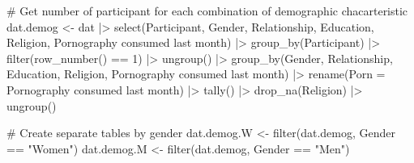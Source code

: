 \documentclass[
  bookmarksnumbered]{article}
\newenvironment{Shaded}{\begin{snugshade}}{\end{snugshade}}
\newcommand{\AttributeTok}[1]{\textcolor[rgb]{0.80,0.80,0.80}{#1}}
\newcommand{\CommentTok}[1]{\textcolor[rgb]{0.50,0.62,0.50}{#1}}
\newcommand{\DecValTok}[1]{\textcolor[rgb]{0.86,0.86,0.80}{#1}}
\newcommand{\FunctionTok}[1]{\textcolor[rgb]{0.94,0.94,0.56}{#1}}
\newcommand{\NormalTok}[1]{\textcolor[rgb]{0.80,0.80,0.80}{#1}}
\newcommand{\OtherTok}[1]{\textcolor[rgb]{0.94,0.94,0.56}{#1}}
\newcommand{\SpecialCharTok}[1]{\textcolor[rgb]{0.86,0.64,0.64}{#1}}
\newcommand{\StringTok}[1]{\textcolor[rgb]{0.80,0.58,0.58}{#1}}
\begin{document}
\begin{Shaded}
\begin{Highlighting}[]
\CommentTok{\# Get number of participant for each combination of demographic chacarteristic}
\NormalTok{dat.demog }\OtherTok{\textless{}{-}}\NormalTok{ dat }\SpecialCharTok{|\textgreater{}}
  \FunctionTok{select}\NormalTok{(Participant, Gender, Relationship, Education, Religion, }
         \StringTok{\textasciigrave{}}\AttributeTok{Pornography consumed last month}\StringTok{\textasciigrave{}}\NormalTok{) }\SpecialCharTok{|\textgreater{}}
  \FunctionTok{group\_by}\NormalTok{(Participant) }\SpecialCharTok{|\textgreater{}} 
  \FunctionTok{filter}\NormalTok{(}\FunctionTok{row\_number}\NormalTok{() }\SpecialCharTok{==} \DecValTok{1}\NormalTok{) }\SpecialCharTok{|\textgreater{}} 
  \FunctionTok{ungroup}\NormalTok{() }\SpecialCharTok{|\textgreater{}}
  \FunctionTok{group\_by}\NormalTok{(Gender, Relationship, Education, Religion, }
         \StringTok{\textasciigrave{}}\AttributeTok{Pornography consumed last month}\StringTok{\textasciigrave{}}\NormalTok{) }\SpecialCharTok{|\textgreater{}}
  \FunctionTok{rename}\NormalTok{(}\AttributeTok{Porn =} \StringTok{\textasciigrave{}}\AttributeTok{Pornography consumed last month}\StringTok{\textasciigrave{}}\NormalTok{) }\SpecialCharTok{|\textgreater{}} 
  \FunctionTok{tally}\NormalTok{() }\SpecialCharTok{|\textgreater{}} 
  \FunctionTok{drop\_na}\NormalTok{(Religion) }\SpecialCharTok{|\textgreater{}} 
  \FunctionTok{ungroup}\NormalTok{()}

\CommentTok{\# Create separate tables by gender}
\NormalTok{dat.demog.W }\OtherTok{\textless{}{-}} \FunctionTok{filter}\NormalTok{(dat.demog, Gender }\SpecialCharTok{==} \StringTok{"Women"}\NormalTok{)}
\NormalTok{dat.demog.M }\OtherTok{\textless{}{-}} \FunctionTok{filter}\NormalTok{(dat.demog, Gender }\SpecialCharTok{==} \StringTok{"Men"}\NormalTok{)}


\end{Highlighting}
\end{Shaded}
\end{document}
